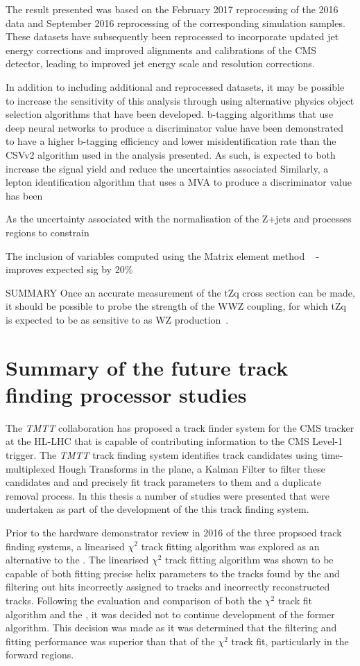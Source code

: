 The result presented was based on the February 2017 reprocessing of the 2016 data and September 2016 reprocessing of the corresponding simulation samples.
These datasets have subsequently been reprocessed to incorporate updated jet energy corrections and improved alignments and calibrations of the CMS detector, leading to improved jet energy scale and resolution corrections.

In addition to including additional and reprocessed datasets, it may be possible to increase the sensitivity of this analysis through using alternative physics object selection algorithms that have been developed.	
b-tagging algorithms that use deep neural networks to produce a discriminator value have been demonstrated to have a higher b-tagging efficiency and lower misidentification rate than the CSVv2 algorithm used in the analysis presented.
As such, is expected to both increase the signal yield and reduce the uncertainties associated 
Similarly, a lepton identification algorithm that uses a MVA to produce a discriminator value has been 

As the uncertainty associated with the normalisation of the Z+jets and \ttbar processes
regions to constrain 

The inclusion of variables computed using the Matrix element method ~\cite{Sirunyan:2017nbr,Abazov:2004cs} - improves expected sig by 20\%

SUMMARY
Once an accurate measurement of the tZq cross section can be made, it should be possible to probe the strength of the WWZ coupling, for which tZq is expected to be as sensitive to as WZ production~\cite{Campbell:2013yla}.

\section{Summary of the future track finding processor studies}
The \emph{TMTT} collaboration has proposed a track finder system for the CMS tracker at the HL-LHC that is capable of contributing information to the CMS Level-1 trigger.
The \emph{TMTT} track finding system identifies track candidates using time-multiplexed Hough Transforms in the \rphi plane, a Kalman Filter to filter these candidates and and precisely fit track parameters to them and a duplicate removal process.
In this thesis a number of studies were presented that were undertaken as part of the development of the this track finding system.

Prior to the hardware demonstrator review in 2016 of the three propsoed track finding systems, a linearised $\chi^{2}$ track fitting algorithm was explored as an alternative to the \KF.
The linearised $\chi^{2}$ track fitting algorithm was shown to be capable of both fitting precise helix parameters to the tracks found by the \HT and filtering out hits incorrectly assigned to tracks and incorrectly reconstructed tracks.
Following the evaluation and comparison of both the $\chi^{2}$ track fit algorithm and the \KF, it was decided not to continue development of the former algorithm.
This decision was made as it was determined that the \KF filtering and fitting performance was superior than that of the $\chi^{2}$ track fit, particularly in the forward regions.

